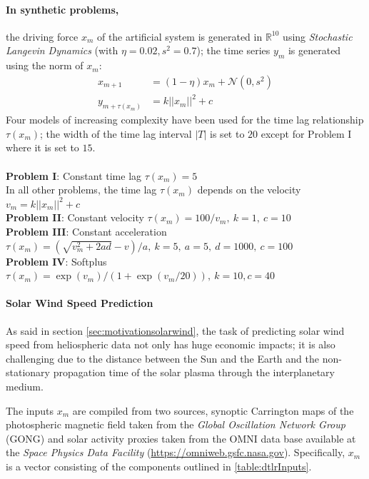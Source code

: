 \paragraph{In synthetic problems,} the driving force $x_m$ of the artificial system is generated in 
$\mathbb{R}^{10}$ using \emph{Stochastic Langevin Dynamics} (with $\eta = 0.02, s^2 = 0.7$); the 
time series $y_m$ is generated using the norm of $x_m$:
% 
\begin{align}
 x_{m+1} &= (1 - \eta) x_m + \mathcal{N}(0, s^2) \label{eq:data}\\
 y_{m+\tau(x_m)} &= k ||x_m||^2 + c \label{eq:outputs}
\end{align}
%
Four models of increasing complexity have been used for the time lag relationship $\tau(x_m)$; the 
width of the time lag interval $|T|$ is set to $20$ except for Problem I where it is set to $15$.
\\\\
%
{\bf Problem I}: Constant time lag $\tau(x_m) = 5$\\
%
In all other problems, the time lag $\tau(x_m)$ depends on the velocity $v_m = k ||x_m||^2 + c$\\
%
{\bf Problem II}: Constant velocity $\tau(x_m) = 100/v_m,\ k = 1,\ c = 10$\\
%
{\bf Problem III}: Constant acceleration 
$\tau(x_m) = (\sqrt{v_m^2 + 2ad} - v)/a,\ k = 5,\ a = 5,\ d = 1000, \ c = 100$
\\
%
{\bf Problem IV}: Softplus 
$\tau(x_m) = \exp\left(v_m\right)/\left(1 + \exp(v_m/20)\right), \ k = 10, c = 40$\\

\paragraph{Solar Wind Speed Prediction}\label{sec:solarwind}
As said in section \ref{sec:motivationsolarwind}, the task of predicting solar wind speed from 
heliospheric data not only has huge economic impacts; it is also challenging due to the distance 
between the Sun and the Earth and the non-stationary propagation time of the solar plasma through 
the interplanetary medium. 

The inputs $x_m$ are compiled from two sources, synoptic Carrington maps of the photospheric 
magnetic field taken from the \emph{Global Oscillation Network Group} (GONG) and solar activity 
proxies taken from the OMNI data base available at the \emph{Space Physics Data Facility} 
(\url{https://omniweb.gsfc.nasa.gov}). Specifically, $x_m$ is a vector consisting of the 
components outlined in \cref{table:dtlrInputs}.

